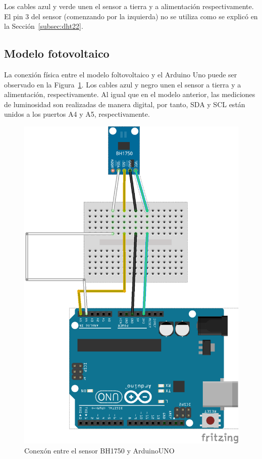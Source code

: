 Los cables azul y verde unen el sensor a tierra y a alimentaci\'on
respectivamente.
El pin 3 del sensor (comenzando por la izquierda) no se utiliza como
se explic\'o en la Secci\'on~\ref{subsec:dht22}.


\subsection{Modelo fotovoltaico}
La conexi\'on f\'isica entre el modelo foltovoltaico y el Arduino Uno
puede ser observado en la Figura~\ref{fig:bh1750}. Los cables azul y
negro unen el sensor a tierra y a alimentaci\'on, respectivamente.
Al igual que en el modelo anterior, las mediciones de luminosidad son
realizadas de manera digital, por tanto, SDA y SCL est\'an unidos a los puertos A4 y A5, respectivamente.

\begin{center}
\begin{figure}[h]\label{fig:bh1750}
\includegraphics{images/bh1750_bb.png}
\caption{Conex\'on entre el sensor BH1750 y ArduinoUNO}

\end{figure}
\end{center}
